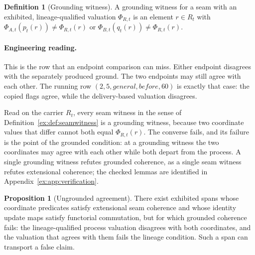 \documentclass[11pt]{article}
\theoremstyle{definition}
\newtheorem{definition}{Definition}[section]
\newtheorem{proposition}{Proposition}[section]
\begin{document}
\begin{definition}[Grounding witness]\label{ex:def:grounding-witness}
A grounding witness for a seam with an exhibited, lineage-qualified valuation $\Phi_{R,t}$ is an element $r\in R_t$ with $\Phi_{A,t}(p_t(r))\neq\Phi_{R,t}(r)$ or $\Phi_{B,t}(q_t(r))\neq\Phi_{R,t}(r)$.
\end{definition}

\paragraph{Engineering reading.} This is the row that an endpoint comparison can miss. Either endpoint disagrees with the separately produced ground. The two endpoints may still agree with each other. The running row $(2,5,\mathit{general},\mathit{before},60)$ is exactly that case: the copied flags agree, while the delivery-based valuation disagrees.

Read on the carrier $R_t$, every seam witness in the sense of Definition~\ref{ex:def:seamwitness} is a grounding witness, because two coordinate values that differ cannot both equal $\Phi_{R,t}(r)$. The converse fails, and its failure is the point of the grounded condition: at a grounding witness the two coordinates may agree with each other while both depart from the process. A single grounding witness refutes grounded coherence, as a single seam witness refutes extensional coherence; the checked lemmas are identified in Appendix~\ref{ex:app:verification}.

\begin{proposition}[Ungrounded agreement]\label{ex:prop:ungrounded-agreement}
There exist exhibited spans whose coordinate predicates satisfy extensional seam coherence and whose identity update maps satisfy functorial commutation, but for which grounded coherence fails: the lineage-qualified process valuation disagrees with both coordinates, and the valuation that agrees with them fails the lineage condition. Such a span can transport a false claim.
\end{proposition}
\end{document}
